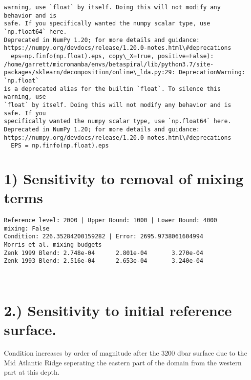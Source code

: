 \documentclass[11pt]{article}
\begin{document}
\begin{Verbatim}[commandchars=\\\{\}]
warning, use `float` by itself. Doing this will not modify any behavior and is
safe. If you specifically wanted the numpy scalar type, use `np.float64` here.
Deprecated in NumPy 1.20; for more details and guidance:
https://numpy.org/devdocs/release/1.20.0-notes.html\#deprecations
  eps=np.finfo(np.float).eps, copy\_X=True, positive=False):
/home/garrett/micromamba/envs/betaspiral/lib/python3.7/site-
packages/sklearn/decomposition/online\_lda.py:29: DeprecationWarning: `np.float`
is a deprecated alias for the builtin `float`. To silence this warning, use
`float` by itself. Doing this will not modify any behavior and is safe. If you
specifically wanted the numpy scalar type, use `np.float64` here.
Deprecated in NumPy 1.20; for more details and guidance:
https://numpy.org/devdocs/release/1.20.0-notes.html\#deprecations
  EPS = np.finfo(np.float).eps
    \end{Verbatim}

    \hypertarget{sensitivity-to-removal-of-mixing-terms}{%
\section{1) Sensitivity to removal of mixing
terms}\label{sensitivity-to-removal-of-mixing-terms}}

    \begin{Verbatim}[commandchars=\\\{\}]
Reference level: 2000 | Upper Bound: 1000 | Lower Bound: 4000
mixing: False
Condition: 226.35284200159282 | Error: 2695.9738061604994
Morris et al. mixing budgets
Zenk 1999 Blend: 2.748e-04      2.801e-04       3.270e-04
Zenk 1993 Blend: 2.516e-04      2.653e-04       3.240e-04
    \end{Verbatim}

    \begin{center}
    \end{center}
    { \hspace*{\fill} \\}
    
    \hypertarget{sensitivity-to-initial-reference-surface.}{%
\section{2.) Sensitivity to initial reference
surface.}\label{sensitivity-to-initial-reference-surface.}}

Condition increases by order of magnitude after the 3200 dbar surface
due to the Mid Atlantic Ridge seperating the eastern part of the domain
from the western part at this depth.
\end{document}
